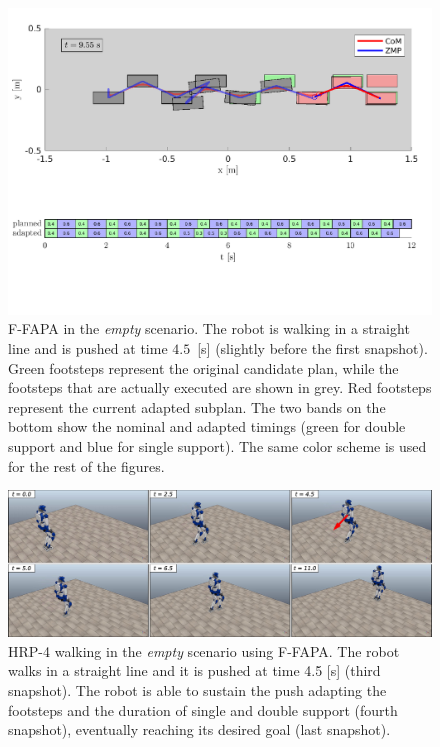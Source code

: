 \begin{figure}
    \includegraphics[trim={0 2.2cm 0 8.6cm},clip,width=\textwidth]{figures/empty-fixed-plot-completing-task.pdf}
    \caption{F-FAPA in the {\em empty} scenario. The robot is walking in a
        straight line and is pushed at time $4.5$~[s] (slightly before the first
        snapshot). Green footsteps represent the original candidate plan, while
        the footsteps that are actually executed are shown in grey. Red
        footsteps represent the current adapted subplan. The two bands on the
        bottom show the nominal and adapted timings (green for double support
        and blue for single support). The same color scheme is used for the
        rest of the figures.
    }
    \label{fig:FAPA:matlab_empty}
\end{figure}

\begin{figure}
    \centering
    \includegraphics[width=\textwidth]{figures/empty-push-fixed-snapshots.jpeg}
    \caption{HRP-4 walking in the \textit{empty} scenario using F-FAPA.
        The robot walks in a straight line and it is pushed at time 4.5 [s]
        (third snapshot). The robot is able to sustain the push adapting the
        footsteps and the duration of single and double support
        (fourth snapshot), eventually reaching its desired goal (last snapshot).
    }
    \label{fig:FAPA:sim1:snapshots}
\end{figure}

